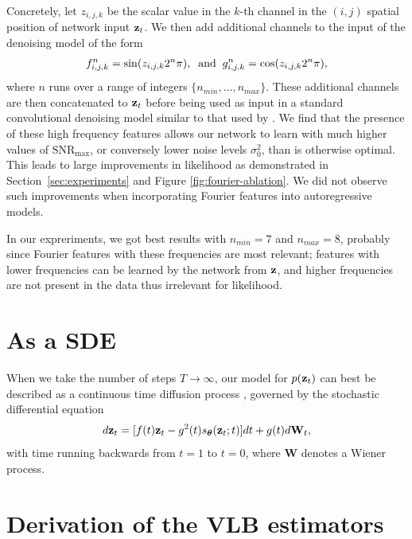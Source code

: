 \documentclass{article}
\newcommand{\snrmax}{\text{SNR}_{\text{max}}}
\def\rvW{{\mathbf{W}}}
\begin{document}
Concretely, let $z_{i,j,k}$ be the scalar value in the $k$-th channel in the $(i,j)$ spatial position of network input ${\mathbf{z}}_t$. We then add additional channels to the input of the denoising model of the form
\begin{align}
f^{n}_{i,j,k} = \sin(z_{i,j,k}2^{n}\pi), \text{\;\;and\;\;} g^{n}_{i,j,k} = \cos(z_{i,j,k}2^{n}\pi),
\end{align}
where $n$ runs over a range of integers $\{n_{min}, ..., n_{max}\}$. These additional channels are then concatenated to ${\mathbf{z}}_t$ before being used as input in a standard convolutional denoising model similar to that used by \citet{ho2020denoising}. We find that the presence of these high frequency features allows our network to learn with much higher values of $\snrmax$, or conversely lower noise levels $\sigma^{2}_{0}$, than is otherwise optimal. This leads to large improvements in likelihood as demonstrated in Section~\ref{sec:experiments} and Figure \ref{fig:fourier-ablation}. We did not observe such improvements when incorporating Fourier features into autoregressive models.

In our expreriments, we got best results with $n_{min}=7$ and $n_{max}=8$, probably since Fourier features with these frequencies are most relevant; features with lower frequencies can be learned by the network from ${\mathbf{z}}$, and higher frequencies are not present in the data thus irrelevant for likelihood.

\section{As a SDE}
\label{sec:sde}
When we take the number of steps $T\rightarrow\infty$, our model for $p({\mathbf{z}}_t)$ can best be described as a continuous time diffusion process \citep{song2020score}, governed by the stochastic differential equation
\begin{align}
d\rvz_t = [f(t)\rvz_{t} - g^{2}(t)s_{\bT}(\rvz_t; t)] dt + g(t)d\rvW_{t},
\end{align}
with time running backwards from $t=1$ to $t=0$, where $\rvW$ denotes a Wiener process.

%
%
%
%
%


\section{Derivation of the VLB estimators}
\label{sec:objective}
\end{document}
